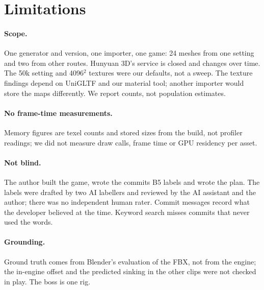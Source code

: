 \section{Limitations}

\paragraph{Scope.} One generator and version, one importer, one game: 24 meshes
from one setting and two from other routes. Hunyuan 3D's service is closed and
changes over time. The 50k setting and 4096$^2$ textures were our defaults, not
a sweep. The texture findings depend on UniGLTF and our material tool; another
importer would store the maps differently. We report counts, not population
estimates.

\paragraph{No frame-time measurements.} Memory figures are texel counts and
stored sizes from the build, not profiler readings; we did not measure draw calls,
frame time or GPU residency per asset.

\paragraph{Not blind.} The author built the game, wrote the commits B5 labels
and wrote the plan. The labels were drafted by two AI labellers and reviewed by
the AI assistant and the author; there was no independent human rater. Commit
messages record what the developer believed at the time. Keyword search misses
commits that never used the words.

\paragraph{Grounding.} Ground truth comes from Blender's evaluation of the FBX,
not from the engine; the in-engine offset and the predicted sinking in the other
clips were not checked in play. The boss is one rig.

